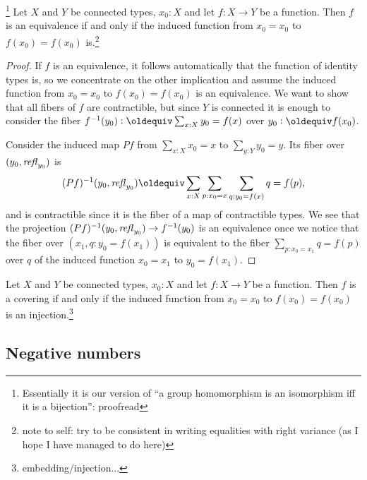 \begin{lemma}\label{lem:eqofconntypes}\footnote{
Essentially it is our version of ``a group homomorphism is an isomorphism iff it is a bijection'': proofread}
  Let $X$ and $Y$ be connected types, $x_0:X$ and let $f:X\to Y$ be a function.  Then $f$ is an equivalence if and only if the induced function from $x_0=x_0$ to $f(x_0)=f(x_0)$ is.\footnote{note to self: try to be consistent in writing equalities with right variance (as I hope I have managed to do here)}
\end{lemma}
\begin{proof}
  If $f$ is an equivalence, it follows automatically that the function of identity types is, so we concentrate on the other implication and assume the induced function from $x_0=x_0$ to $f(x_0)=f(x_0)$ is an equivalence.  We want to show that all fibers of $f$ are contractible, but since $Y$ is connected it is enough to consider the fiber $f^{-1}(y_0)\defequi\sum_{x:X}y_0=f(x)$ over $y_0\defequi f(x_0)$.  

Consider the induced map $Pf$ from $\sum_{x:X}x_0=x$ to $\sum_{y:Y}y_0=y$.  Its fiber over $(y_0,\mathop{{\it refl}_{y_0}})$ is 
$$(Pf)^{-1}(y_0,\refl{y_0})\oldequiv\sum_{x:X}\sum_{p:x_0=x}\sum_{q:y_0=f(x)}q=f(p),$$ and is contractible since it is the fiber of a map of contractible types.  We see that the projection $(Pf)^{-1}(y_0,\mathop{{\it refl}_{y_0}})\to f^{-1}(y_0)$ is an equivalence once we notice that the fiber over $(x_1,q:y_0=f(x_1)) $ is equivalent to the fiber $\sum_{p:x_0=x_1}q=f(p)$ over $q$ of the induced function $x_0=x_1$ to $y_0=f(x_1)$.
\end{proof}
\begin{lemma}
  Let $X$ and $Y$ be connected types, $x_0:X$ and let $f:X\to Y$ be a function.  Then $f$ is a covering if and only if the induced function from $x_0=x_0$ to $f(x_0)=f(x_0)$ is an injection.\footnote{embedding/injection...}
\end{lemma}



\subsection{Negative numbers}
\label{sec:negativenumbers}

